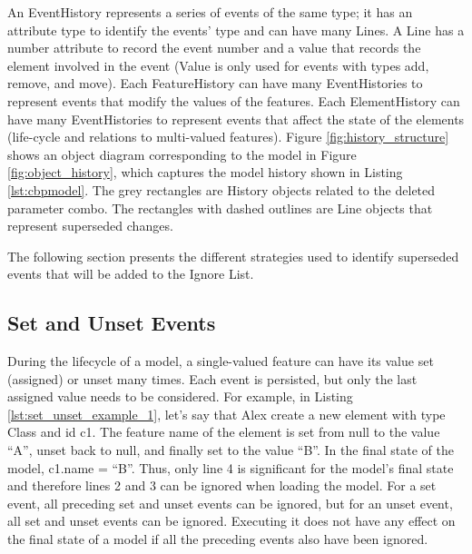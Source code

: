 An \textsf{EventHistory} represents a series of events of the same type; it has an attribute \textsf{type} to identify the events’ type and can have many \textsf{Line}s. A \textsf{Line} has a \textsf{number} attribute to record the event number and a \textsf{value} that records the element involved in the event (Value is only used for events with types \textsf{add}, \textsf{remove}, and \textsf{move}). Each \textsf{FeatureHistory} can have many \textsf{EventHistories} to represent events that modify the values of the features. Each \textsf{ElementHistory} can have many \textsf{EventHistories} to represent events that affect the state of the elements (life-cycle and relations to multi-valued features). Figure \ref{fig:history_structure} shows an object diagram corresponding to the model in Figure \ref{fig:object_history}, which captures the model history shown in Listing \ref{lst:cbpmodel}. The grey rectangles are \textsf{History} objects related to the deleted parameter \textsf{combo}. The rectangles with dashed outlines are \textsf{Line} objects that represent superseded changes.

The following section presents the different strategies used to identify superseded events that will be added to the Ignore List.

\subsection{Set and Unset Events}
\label{subsec:set_and_unset_operations}
During the lifecycle of a model, a single-valued feature can have its value set (assigned) or unset many times. Each event is persisted, but only the last assigned value needs to be considered. For example, in Listing \ref{lst:set_unset_example_1}, let's say that Alex create a new element with type \textsf{Class} and id \textsf{c1}. The feature \textsf{name} of the element is set from null to the value ``A'', unset back to null, and finally set to the value ``B''. In the final state of the model, \textsf{c1.name} = ``B''. Thus, only line 4 is significant for the model’s final state and therefore lines 2 and 3 can be ignored when loading the model. For a \textsf{set} event, all preceding \textsf{set} and \textsf{unset} events can be ignored, but for an \textsf{unset} event, all \textsf{set} and \textsf{unset} events can be ignored. Executing it does not have any effect on the final state of a model if all the preceding events also have been ignored.

